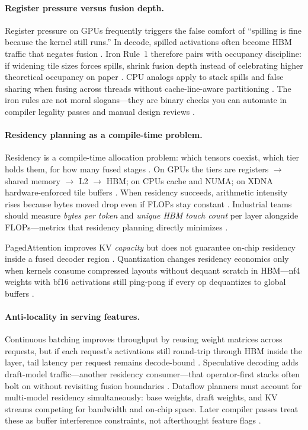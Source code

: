 \paragraph{Register pressure versus fusion depth.}
Register pressure on GPUs frequently triggers the false comfort of ``spilling is fine because the kernel still runs.''
In decode, spilled activations often become HBM traffic that negates fusion \citep{memoryfloor2026}.
Iron Rule~1 therefore pairs with occupancy discipline: if widening tile sizes forces spills, shrink fusion depth instead of celebrating higher theoretical occupancy on paper \citep{yirage2026}.
CPU analogs apply to stack spills and false sharing when fusing across threads without cache-line-aware partitioning \citep{patel2025llminference}.
The iron rules are not moral slogans---they are binary checks you can automate in compiler legality passes and manual design reviews \citep{chen2020compilerbasedhardw}.

\paragraph{Residency planning as a compile-time problem.}
Residency is a compile-time allocation problem: which tensors coexist, which tier holds them, for how many fused stages \citep{yirage2026}.
On GPUs the tiers are registers $\rightarrow$ shared memory $\rightarrow$ L2 $\rightarrow$ HBM; on CPUs cache and NUMA; on XDNA hardware-enforced tile buffers \citep{amd2024xdna,nvidia2022hopper}.
When residency succeeds, arithmetic intensity rises because bytes moved drop even if FLOPs stay constant \citep{memoryfloor2026,dlbook}.
Industrial teams should measure \emph{bytes per token} and \emph{unique HBM touch count} per layer alongside FLOPs---metrics that residency planning directly minimizes \citep{taxbreak2026}.

PagedAttention improves KV \emph{capacity} but does not guarantee on-chip residency inside a fused decoder region \citep{kwon2023vllm}.
Quantization changes residency economics only when kernels consume compressed layouts without dequant scratch in HBM---nf4 weights with bf16 activations still ping-pong if every op dequantizes to global buffers \citep{liu2024deepseekv3}.

\paragraph{Anti-locality in serving features.}
Continuous batching improves throughput by reusing weight matrices across requests, but if each request's activations still round-trip through HBM inside the layer, tail latency per request remains decode-bound \citep{kwon2023vllm}.
Speculative decoding adds draft-model traffic---another residency consumer---that operator-first stacks often bolt on without revisiting fusion boundaries \citep{patel2025llminference}.
Dataflow planners must account for multi-model residency simultaneously: base weights, draft weights, and KV streams competing for bandwidth and on-chip space.
Later compiler passes treat these as buffer interference constraints, not afterthought feature flags \citep{yirage2026}.

